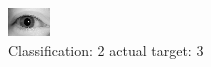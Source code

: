 \begin{figure}[h!]
\begin{center}
\includegraphics[width=0.60\columnwidth]{figures/ID3096_class_2_target_3.png}
\end{center}
\caption{ Classification: 2 actual target: 3}
\label{fig:ID3096_class_2_target_3}
\end{figure}
